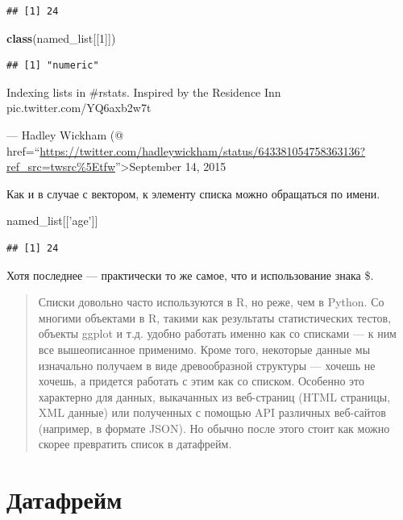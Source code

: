 \documentclass[
]{book}
\newenvironment{Shaded}{\begin{snugshade}}{\end{snugshade}}
\newcommand{\DecValTok}[1]{\textcolor[rgb]{0.00,0.00,0.81}{#1}}
\newcommand{\KeywordTok}[1]{\textcolor[rgb]{0.13,0.29,0.53}{\textbf{#1}}}
\newcommand{\NormalTok}[1]{#1}
\newcommand{\StringTok}[1]{\textcolor[rgb]{0.31,0.60,0.02}{#1}}
\begin{document}
\begin{verbatim}
## [1] 24
\end{verbatim}

\begin{Shaded}
\begin{Highlighting}[]
\KeywordTok{class}\NormalTok{(named_list[[}\DecValTok{1}\NormalTok{]])}
\end{Highlighting}
\end{Shaded}

\begin{verbatim}
## [1] "numeric"
\end{verbatim}

Indexing lists in \#rstats. Inspired by the Residence Inn pic.twitter.com/YQ6axb2w7t

--- Hadley Wickham (@ href=``\url{https://twitter.com/hadleywickham/status/643381054758363136?ref_src=twsrc\%5Etfw}''\textgreater September 14, 2015

Как и в случае с вектором, к элементу списка можно обращаться по имени.

\begin{Shaded}
\begin{Highlighting}[]
\NormalTok{named_list[[}\StringTok{'age'}\NormalTok{]]}
\end{Highlighting}
\end{Shaded}

\begin{verbatim}
## [1] 24
\end{verbatim}

Хотя последнее --- практически то же самое, что и использование знака \$.

\begin{quote}
Списки довольно часто используются в R, но реже, чем в Python. Со многими объектами в R, такими как результаты статистических тестов, объекты ggplot и т.д. удобно работать именно как со списками --- к ним все вышеописанное применимо. Кроме того, некоторые данные мы изначально получаем в виде древообразной структуры --- хочешь не хочешь, а придется работать с этим как со списком. Особенно это характерно для данных, выкачанных из веб-страниц (HTML страницы, XML данные) или полученных с помощью API различных веб-сайтов (например, в формате JSON). Но обычно после этого стоит как можно скорее превратить список в датафрейм.
\end{quote}

\hypertarget{df}{%
\section{Датафрейм}\label{df}}
\end{document}
